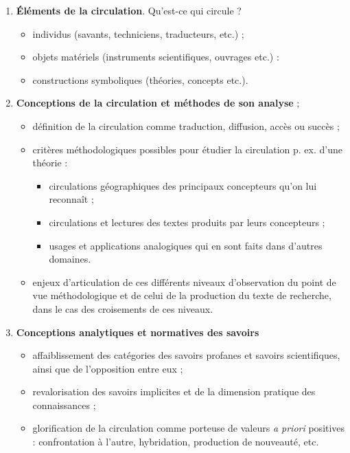 \begin{enumerate}
    \item \textbf{Éléments de la circulation}. Qu'est-ce qui circule ? 
    \begin{itemize}
        \item individus (savants, techniciens, traducteurs, etc.) ;
        \item objets matériels (instruments scientifiques, ouvrages etc.) :
        \item constructions symboliques (théories, concepts etc.).
    \end{itemize}  
    \item \textbf{Conceptions de la circulation et méthodes de son analyse} ;
    \begin{itemize}
        \item définition de la circulation comme \og{}traduction\fg{}, \og{}diffusion\fg{}, \og{}accès\fg{} ou \og{}succès\fg{} ;
        \item critères méthodologiques possibles pour étudier la circulation p. ex. d'une théorie : 
        \begin{itemize}
            \item circulations géographiques des principaux concepteurs qu'on lui reconnaît ;
            \item circulations et lectures des textes produits par leurs concepteurs ;
            \item usages et applications analogiques qui en sont faits dans d'autres domaines.
        \end{itemize} 
        \item enjeux d'articulation de ces différents niveaux d'observation du point de vue méthodologique et de celui de la production du texte de recherche, dans le cas des croisements de ces niveaux.
    \end{itemize}
    \item \textbf{Conceptions analytiques et normatives des savoirs}
    \begin{itemize}
        \item affaiblissement des catégories des \og{}savoirs profanes\fg{} et \og{}savoirs scientifiques\fg{}, ainsi que de l'opposition entre eux ;
        \item revalorisation des savoirs implicites et de la dimension pratique des connaissances ;
        \item glorification de la circulation comme porteuse de valeurs \textit{a priori} positives : confrontation à l'autre, hybridation, production de nouveauté, etc.
    \end{itemize}
\end{enumerate}

